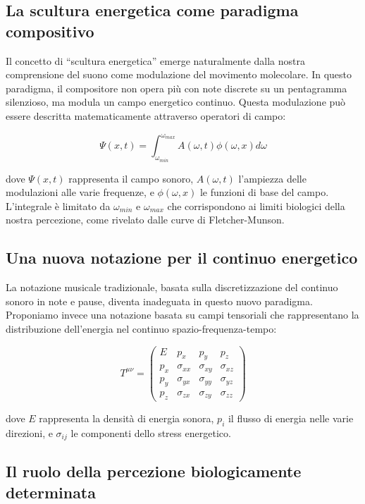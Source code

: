 \documentclass{gs-adonis}
\begin{document}
\subsection{La scultura energetica come paradigma
compositivo}\label{la-scultura-energetica-come-paradigma-compositivo}

Il concetto di ``scultura energetica'' emerge naturalmente dalla nostra
comprensione del suono come modulazione del movimento molecolare. In
questo paradigma, il compositore non opera più con note discrete su un
pentagramma silenzioso, ma modula un campo energetico continuo. Questa
modulazione può essere descritta matematicamente attraverso operatori di
campo:

\[\Psi(x,t) = \int_{\omega_{min}}^{\omega_{max}} A(\omega,t)\phi(\omega,x)d\omega\]

dove \(\Psi(x,t)\) rappresenta il campo sonoro, \(A(\omega,t)\)
l'ampiezza delle modulazioni alle varie frequenze, e \(\phi(\omega,x)\)
le funzioni di base del campo. L'integrale è limitato da
\(\omega_{min}\) e \(\omega_{max}\) che corrispondono ai limiti
biologici della nostra percezione, come rivelato dalle curve di
Fletcher-Munson.

\subsection{Una nuova notazione per il continuo
energetico}\label{una-nuova-notazione-per-il-continuo-energetico}

La notazione musicale tradizionale, basata sulla discretizzazione del
continuo sonoro in note e pause, diventa inadeguata in questo nuovo
paradigma. Proponiamo invece una notazione basata su campi tensoriali
che rappresentano la distribuzione dell'energia nel continuo
spazio-frequenza-tempo:

\[T^{\mu\nu} = \begin{pmatrix}
E & p_x & p_y & p_z \\
p_x & \sigma_{xx} & \sigma_{xy} & \sigma_{xz} \\
p_y & \sigma_{yx} & \sigma_{yy} & \sigma_{yz} \\
p_z & \sigma_{zx} & \sigma_{zy} & \sigma_{zz}
\end{pmatrix}\]

dove \(E\) rappresenta la densità di energia sonora, \(p_i\) il flusso
di energia nelle varie direzioni, e \(\sigma_{ij}\) le componenti dello
stress energetico.

\subsection{Il ruolo della percezione biologicamente
determinata}\label{il-ruolo-della-percezione-biologicamente-determinata}
\end{document}
